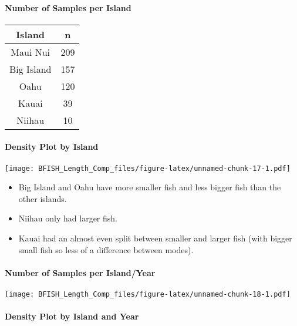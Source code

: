 \documentclass[
]{article}
\providecommand{\tightlist}{%
  \setlength{\itemsep}{0pt}\setlength{\parskip}{0pt}}
\begin{document}
\hypertarget{number-of-samples-per-island}{%
\paragraph{Number of Samples per
Island}\label{number-of-samples-per-island}}

\captionsetup[table]{labelformat=empty,skip=1pt}
\begin{longtable}{cc}
\toprule
Island & n \\ 
\midrule
Maui Nui & 209 \\ 
Big Island & 157 \\ 
Oahu & 120 \\ 
Kauai & 39 \\ 
Niihau & 10 \\ 
\bottomrule
\end{longtable}

\hypertarget{density-plot-by-island}{%
\paragraph{Density Plot by Island}\label{density-plot-by-island}}

\texttt{[image: BFISH\_Length\_Comp\_files/figure-latex/unnamed-chunk-17-1.pdf]}

\begin{itemize}
\tightlist
\item
  Big Island and Oahu have more smaller fish and less bigger fish than
  the other islands.\\
\item
  Niihau only had larger fish.\\
\item
  Kauai had an almost even split between smaller and larger fish (with
  bigger small fish so less of a difference between modes).
\end{itemize}

\hypertarget{number-of-samples-per-islandyear}{%
\paragraph{Number of Samples per
Island/Year}\label{number-of-samples-per-islandyear}}

\texttt{[image: BFISH\_Length\_Comp\_files/figure-latex/unnamed-chunk-18-1.pdf]}

\hypertarget{density-plot-by-island-and-year}{%
\paragraph{Density Plot by Island and
Year}\label{density-plot-by-island-and-year}}
\end{document}
